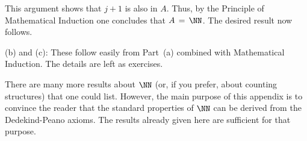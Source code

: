     This argument shows that $j+1$ is also in $A$. Thus, by the Principle of Mathematical Induction one concludes that $A \,=\, {\NN}$. The desired result now follows.

\V

        (b) and (c): These follow easily from Part~(a) combined with Mathematical Induction. The details are left as exercises.

\VV

        There are many more results about ${\NN}$ (or, if you prefer, about counting structures) that one could list.
    However, the main purpose of this appendix is to convince the reader  that the standard properties of ${\NN}$ can be derived from the Dedekind-Peano axioms.
    The results already given here are sufficient for that purpose.

